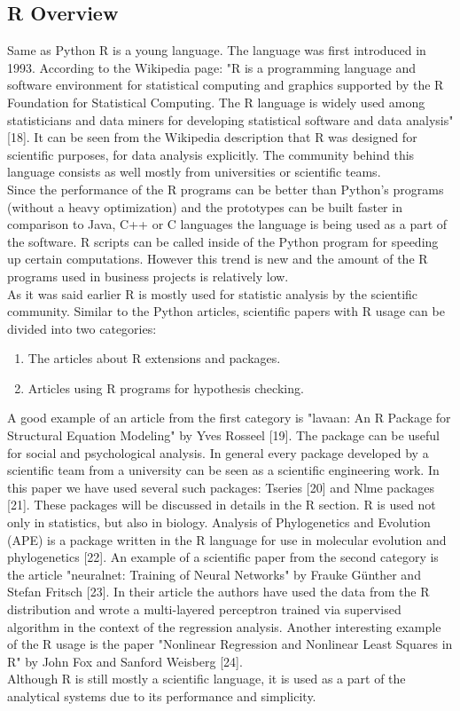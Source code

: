 \documentclass [twoside,
  11pt, a4paper,
  footinclude=true,
  headinclude=true,
  cleardoublepage=empty
]{article}
\begin{document}
\subsection{R Overview}
Same as Python R is a young language. The language was first introduced in 1993. According to the Wikipedia page: "R is a programming language and software environment for statistical computing and graphics supported by the R Foundation for Statistical Computing. The R language is widely used among statisticians and data miners for developing statistical software and data analysis" [18]. It can be seen from the Wikipedia description that R was designed for scientific purposes, for data analysis explicitly. The community behind this language consists as well mostly from universities or scientific teams. \\
Since the performance of the R programs can be better than Python's programs (without a heavy optimization) and the prototypes can be built faster in comparison to Java, C++ or C languages the language is being used as a part of the software. R scripts can be called inside of the Python program for speeding up certain computations. However this trend is new and the amount of the R programs used in business projects is relatively low.\\
As it was said earlier R is mostly used for statistic analysis by the scientific community. Similar to the Python articles, scientific papers with R usage can be divided into two categories:
\begin{enumerate}
    \item The articles about R extensions and packages.
    \item Articles using R programs for hypothesis checking.
\end{enumerate}
A good example of an article from the first category is "lavaan: An R Package for Structural Equation Modeling" by Yves Rosseel [19]. The package can be useful for social and psychological analysis. In general every package developed by a scientific team from a university can be seen as a scientific engineering work. In this paper we have used several such packages: Tseries [20] and Nlme packages [21]. These packages will be discussed in details in the R section. R is used not only in statistics, but also in biology. Analysis of Phylogenetics and Evolution (APE) is a package written in the R language for use in molecular evolution and phylogenetics [22].
An example of a scientific paper from the second category is the article "neuralnet: Training of Neural Networks" by Frauke Günther and Stefan Fritsch [23]. In their article the authors have used the data from the R distribution and wrote a multi-layered perceptron trained via supervised algorithm in the context of the regression analysis. Another interesting example of the R usage is the paper "Nonlinear Regression and Nonlinear Least Squares in R" by John Fox and Sanford Weisberg [24].\\
Although R is still mostly a scientific language, it is used as a part of the analytical systems due to its performance and simplicity.
\end{document}
